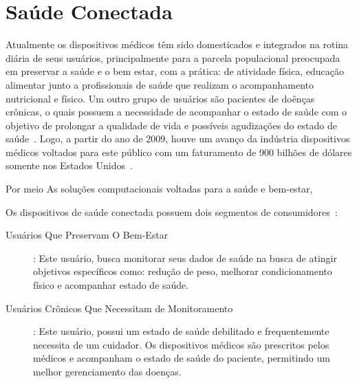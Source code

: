 \chapter{Saúde Conectada}\label{chapter:saude_conectada}

Atualmente os dispositivos médicos têm sido domesticados e integrados na rotina diária de seus usuários, principalmente para a parcela populacional preocupada em preservar a saúde e o bem estar, com a prática: de atividade física, educação alimentar junto a profissionais de saúde que realizam o acompanhamento nutricional e físico. Um outro grupo de usuários são pacientes de doênças crônicas, o quais possuem a necessidade de acompanhar o estado de saúde com o objetivo de prolongar a qualidade de vida e possíveis agudizações do estado de saúde~\cite{ibmconnec2011}.  Logo, a partir do ano de 2009, houve um avanço da indústria dispositivos médicos voltados para este público com um faturamento de 900 bilhões de dólares somente nos Estados Unidos~\cite{ibmconnec2011}. 

Por meio As soluções computacionais voltadas para a saúde e bem-estar, 


Os dispositivos de saúde conectada possuem dois segmentos de consumidores~\cite{ibmconnec2011}:

\begin{description}
 \item [Usuários Que Preservam O Bem-Estar]: Este usuário, busca monitorar seus dados de saúde na busca de atingir objetivos específicos como: redução de peso, melhorar condicionamento físico e acompanhar estado de saúde.
 \item [Usuários Crônicos Que Necessitam de Monitoramento]: Este usuário, possui um estado de saúde debilitado e frequentemente necessita de um cuidador. Os dispositivos médicos são prescritos pelos médicos e acompanham o estado de saúde do paciente, permitindo um melhor gerenciamento das doenças.
\end{description}


~\cite{smarthealth2013}